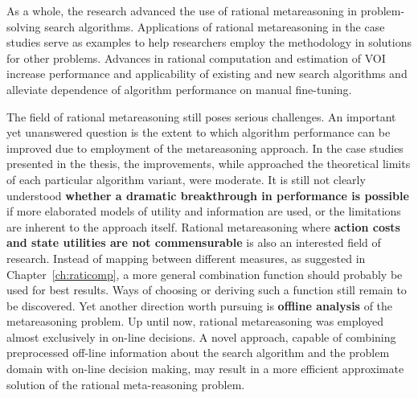 As a whole, the research advanced the use of rational
metareasoning in problem-solving search algorithms. Applications of
rational metareasoning in the case studies serve as examples
to help researchers employ the methodology in solutions for other
problems. Advances in rational computation and estimation of VOI increase
performance and applicability of existing and new search algorithms
and alleviate dependence of algorithm performance on manual
fine-tuning.

The field of rational metareasoning still poses serious
challenges. An important yet unanswered question is the extent
to which algorithm performance can be improved due to employment of
the metareasoning approach. In the case studies presented in the thesis,
the improvements, while approached the theoretical limits of each
particular algorithm variant, were moderate. It is still not clearly
understood \textbf{whether a dramatic breakthrough in performance is possible}
if more elaborated models of utility and information are used, or the 
limitations are inherent to the approach itself. Rational
metareasoning where \textbf{action costs and state utilities are not
  commensurable} is also an interested field of research. Instead of
mapping between different measures, as suggested in
Chapter~\ref{ch:raticomp}, a more general combination function should
probably be used for best results. Ways of choosing or deriving such a
function still remain to be discovered. Yet another direction worth
pursuing is \textbf{offline analysis} of the metareasoning
problem. Up until now, rational metareasoning was employed almost
exclusively in on-line decisions. A novel approach, capable of combining
preprocessed off-line information about the search algorithm and the
problem domain with on-line decision making, may result in a more
efficient approximate solution of the rational meta-reasoning problem.
